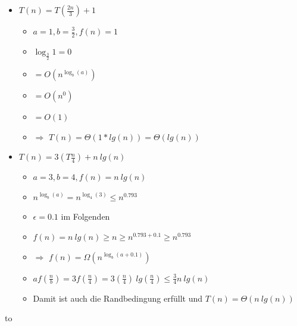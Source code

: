 \documentclass[
    12pt,
    a4paper,
    ngerman,
    color=3b,%
    marginpar=false,
    colorback=false,
    leqno,
]{tudaexercise}
\begin{document}
\begin{itemize}
\begin{itemize}
\begin{itemize}
                        \item \textit{$T(n) = T(\frac{2n}{3}) + 1$}
                              \begin{itemize}
                                  \item $a=1, b= \frac{3}{2}, f(n) = 1$
                                  \item $\log_{\frac{3}{2}} 1 = 0$
                                  \item {} $= O(n^{\log_b(a)})$
                                  \item[] {\makebox[1.5cm][l]{}} $= O(n^0)$
                                  \item[] {\makebox[1.5cm][l]{}} $= O(1)$
                                  \item {} $\Rightarrow$ $T(n) = \Theta(1 * lg(n)) = \Theta(lg(n))$
                              \end{itemize}

                        \item \textit{$T(n) = 3(T\frac{n}{4}) + n~lg(n)$}
                              \begin{itemize}
                                  \item $a=3,b=4,f(n)= n~lg(n)$
                                  \item $n^{\log_b(a)} = n^{\log_4(3)} \leq n^{0.793}$
                                  \item $\epsilon = 0.1$ im Folgenden
                                  \item $f(n) = n~lg(n) \geq n \geq n^{0.793 + 0.1} \geq n^{0.793}$
                                  \item {} $\Rightarrow$ $f(n) = \Omega(n^{\log_b(a+0.1)})$
                                  \item $a f(\frac{n}{b}) = 3f(\frac{n}{4}) = 3(\frac{n}{4})~lg(\frac{n}{4}) \leq \frac{3}{4} n~lg(n)$
                                  \item Damit ist auch die Randbedingung erfüllt und $T(n) = \Theta(n~lg(n))$

                              \end{itemize}
                    \end{itemize}
          \end{itemize}

\end{itemize}
\hbox to 
\end{document}
